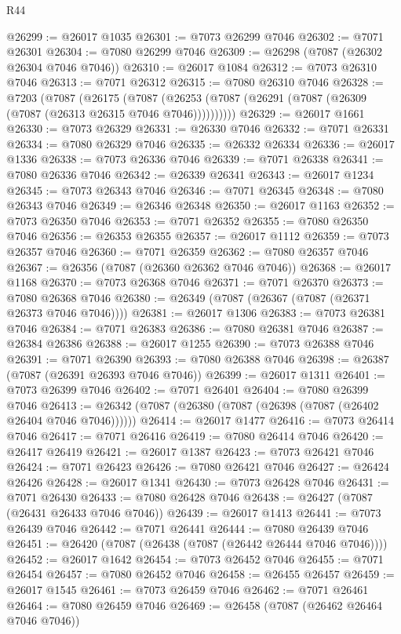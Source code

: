 \begin{lexlean}{R44}
\begin{coremodule}
{@26299 := @26017 @1035
@26301 := @7073 @26299 @7046
@26302 := @7071 @26301
@26304 := @7080 @26299 @7046
@26309 := @26298 (@7087 (@26302 @26304 @7046 @7046))
@26310 := @26017 @1084
@26312 := @7073 @26310 @7046
@26313 := @7071 @26312
@26315 := @7080 @26310 @7046
@26328 := @7203
    (@7087
      (@26175
        (@7087 (@26253 (@7087 (@26291 (@7087 (@26309 (@7087 (@26313 @26315 @7046 @7046))))))))))
@26329 := @26017 @1661
@26330 := @7073 @26329
@26331 := @26330 @7046
@26332 := @7071 @26331
@26334 := @7080 @26329 @7046
@26335 := @26332 @26334
@26336 := @26017 @1336
@26338 := @7073 @26336 @7046
@26339 := @7071 @26338
@26341 := @7080 @26336 @7046
@26342 := @26339 @26341
@26343 := @26017 @1234
@26345 := @7073 @26343 @7046
@26346 := @7071 @26345
@26348 := @7080 @26343 @7046
@26349 := @26346 @26348
@26350 := @26017 @1163
@26352 := @7073 @26350 @7046
@26353 := @7071 @26352
@26355 := @7080 @26350 @7046
@26356 := @26353 @26355
@26357 := @26017 @1112
@26359 := @7073 @26357 @7046
@26360 := @7071 @26359
@26362 := @7080 @26357 @7046
@26367 := @26356 (@7087 (@26360 @26362 @7046 @7046))
@26368 := @26017 @1168
@26370 := @7073 @26368 @7046
@26371 := @7071 @26370
@26373 := @7080 @26368 @7046
@26380 := @26349 (@7087 (@26367 (@7087 (@26371 @26373 @7046 @7046))))
@26381 := @26017 @1306
@26383 := @7073 @26381 @7046
@26384 := @7071 @26383
@26386 := @7080 @26381 @7046
@26387 := @26384 @26386
@26388 := @26017 @1255
@26390 := @7073 @26388 @7046
@26391 := @7071 @26390
@26393 := @7080 @26388 @7046
@26398 := @26387 (@7087 (@26391 @26393 @7046 @7046))
@26399 := @26017 @1311
@26401 := @7073 @26399 @7046
@26402 := @7071 @26401
@26404 := @7080 @26399 @7046
@26413 := @26342 (@7087 (@26380 (@7087 (@26398 (@7087 (@26402 @26404 @7046 @7046))))))
@26414 := @26017 @1477
@26416 := @7073 @26414 @7046
@26417 := @7071 @26416
@26419 := @7080 @26414 @7046
@26420 := @26417 @26419
@26421 := @26017 @1387
@26423 := @7073 @26421 @7046
@26424 := @7071 @26423
@26426 := @7080 @26421 @7046
@26427 := @26424 @26426
@26428 := @26017 @1341
@26430 := @7073 @26428 @7046
@26431 := @7071 @26430
@26433 := @7080 @26428 @7046
@26438 := @26427 (@7087 (@26431 @26433 @7046 @7046))
@26439 := @26017 @1413
@26441 := @7073 @26439 @7046
@26442 := @7071 @26441
@26444 := @7080 @26439 @7046
@26451 := @26420 (@7087 (@26438 (@7087 (@26442 @26444 @7046 @7046))))
@26452 := @26017 @1642
@26454 := @7073 @26452 @7046
@26455 := @7071 @26454
@26457 := @7080 @26452 @7046
@26458 := @26455 @26457
@26459 := @26017 @1545
@26461 := @7073 @26459 @7046
@26462 := @7071 @26461
@26464 := @7080 @26459 @7046
@26469 := @26458 (@7087 (@26462 @26464 @7046 @7046))
}
\end{coremodule}
\end{lexlean}
